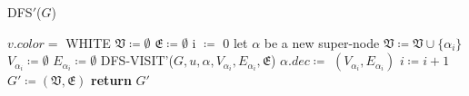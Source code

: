 \begin{algorithm}[!H]
    \caption{DFS$\mathcal{'}$($G$)}\label{alg:cap3}
    \begin{algorithmic}[1]
            \State $v.color =$ WHITE
        \EndFor
        \State $\mathfrak{V} \coloneqq \emptyset$
        \State $\mathfrak{E} \coloneqq \emptyset$
        \State i $\coloneqq$ 0
                \State let $\alpha$ be a new super-node
                \State $\mathfrak{V} \coloneqq \mathfrak{V} \cup \{\alpha_i\}$
                \State $V_{\alpha_i} \coloneqq \emptyset$
                \State $E_{\alpha_i} \coloneqq \emptyset$
                \State DFS-VISIT'($G, u, \alpha, V_{\alpha_i}, E_{\alpha_i}, \mathfrak{E}$)
                \State $\alpha.dec \coloneqq$ $(V_{\alpha_i}, E_{\alpha_i})$
                \State $i \coloneqq i + 1$
            \EndIf
        \EndFor
        \State $G\mathcal{'} \coloneqq (\mathfrak{V}, \mathfrak{E})$
        \State \textbf{return} $G\mathcal{'}$
    \end{algorithmic}
\end{algorithm}